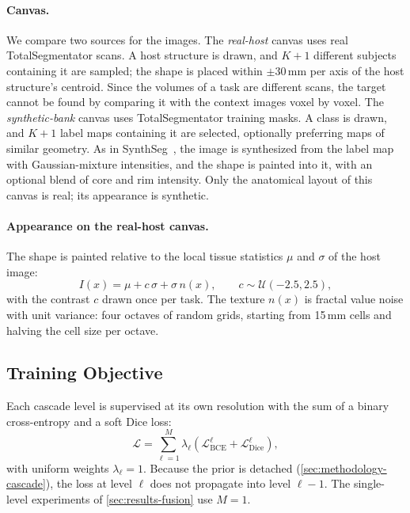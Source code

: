 \documentclass[hidelinks, a4paper, 12pt, ngerman, english]{article}  %
\begin{document}
\paragraph{Canvas.}
We compare two sources for the images.
The \emph{real-host} canvas uses real TotalSegmentator scans. A host structure
is drawn, and $K+1$ different subjects containing it are sampled; the shape is
placed within $\pm 30$\,mm per axis of the host structure's centroid. Since the
volumes of a task are different scans, the target cannot be found by comparing
it with the context images voxel by voxel.
The \emph{synthetic-bank} canvas uses TotalSegmentator training masks. A class is drawn, and $K+1$ label maps containing
it are selected, optionally preferring maps of similar geometry. As in
SynthSeg~\cite{billot2023synthseg}, the image is synthesized from the label
map with Gaussian-mixture intensities, and the shape is painted into it, with
an optional blend of core and rim intensity. Only the anatomical layout of this
canvas is real; its appearance is synthetic.

\paragraph{Appearance on the real-host canvas.}
The shape is painted relative to the local tissue statistics $\mu$ and
$\sigma$ of the host image:
%
\begin{equation}
  I(x) = \mu + c\,\sigma + \sigma\, n(x), \qquad c \sim \mathcal{U}(-2.5, 2.5),
  \label{eq:paint}
\end{equation}
%
with the contrast $c$ drawn once per task. The texture
$n(x)$ is fractal value noise with unit variance: four octaves of random grids,
starting from 15\,mm cells and halving the cell size per octave.
\subsection{Training Objective}\label{sec:methodology-objective}

Each cascade level is supervised at its own resolution with the sum of a
binary cross-entropy and a soft Dice loss:
%
\begin{equation}
  \mathcal{L} = \sum_{\ell=1}^{M} \lambda_\ell \left( \mathcal{L}_{\text{BCE}}^\ell + \mathcal{L}_{\text{Dice}}^\ell \right),
  \label{eq:loss}
\end{equation}
%
with uniform weights $\lambda_\ell = 1$. Because the prior is detached
(\autoref{sec:methodology-cascade}), the loss at level $\ell$ does not
propagate into level $\ell{-}1$. The single-level experiments of
\autoref{sec:results-fusion} use $M = 1$.%
\end{document}
